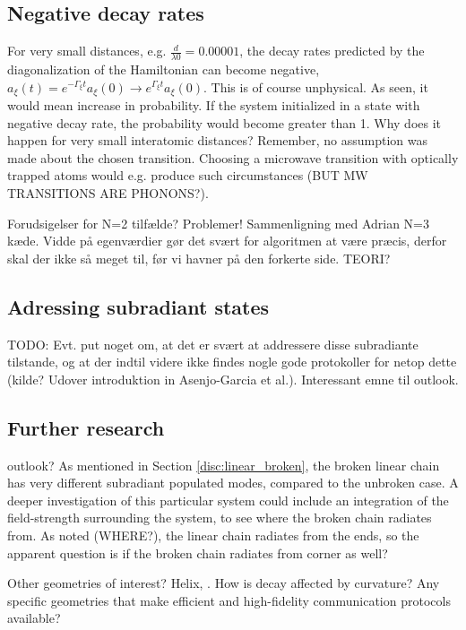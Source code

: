 \documentclass{article}
\begin{document}
\subsection{Negative decay rates}

For very small distances, e.g. $\frac{d}{\lambda0} = 0.00001$, the decay rates predicted by the diagonalization of the Hamiltonian can become negative, $a_\xi(t)=e^{-\Gamma_\xi t} a_\xi (0) \rightarrow e^{\Gamma_\xi t} a_\xi (0)$. This is of course unphysical. As seen, it would mean increase in probability. If the system initialized in a state with negative decay rate, the probability would become greater than 1. Why does it happen for very small interatomic distances? Remember, no assumption was made about the chosen transition. Choosing a microwave transition with optically trapped atoms would e.g. produce such circumstances (BUT MW TRANSITIONS ARE PHONONS?). 

Forudsigelser for N=2 tilfælde? Problemer! Sammenligning med Adrian N=3 kæde. Vidde på egenværdier gør det svært for algoritmen at være præcis, derfor skal der ikke så meget til, før vi havner på den forkerte side. TEORI?

\subsection{Adressing subradiant states}

TODO: Evt. put noget om, at det er svært at addressere disse subradiante tilstande, og at der indtil videre ikke findes nogle gode protokoller for netop dette (kilde? Udover introduktion in Asenjo-Garcia et al.). Interessant emne til outlook.

\subsection{Further research}\label{sec:further}
outlook?
As mentioned in Section \ref{disc:linear_broken}, the broken linear chain has very different subradiant populated modes, compared to the unbroken case. A deeper investigation of this particular system could include an integration of the field-strength surrounding the system, to see where the broken chain radiates from. As noted (WHERE?), the linear chain radiates from the ends, so the apparent question is if the broken chain radiates from corner as well? 

Other geometries of interest? Helix, . How is decay affected by curvature?
Any specific geometries that make efficient and high-fidelity communication protocols available?
\end{document}
